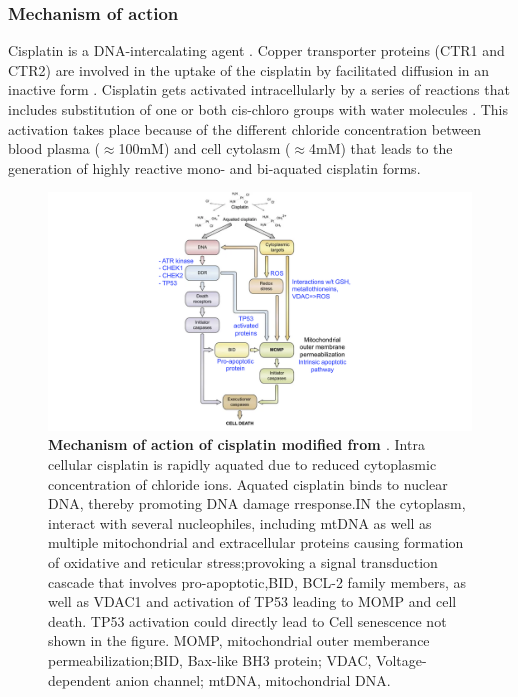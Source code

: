 \subsubsection{Mechanism of action}
Cisplatin is a DNA-intercalating agent \cite{dasari2014cisplatin, kartalou2001mechanisms}. Copper transporter proteins (CTR1 and CTR2) are involved in the uptake of the cisplatin by facilitated diffusion in an inactive form \cite{arnesano2018platinum,ishida2002uptake}. Cisplatin gets activated intracellularly by a series of reactions that includes substitution of one or both cis-chloro groups with water molecules \cite{el1999reactions}. This activation takes place because of the different chloride concentration between blood plasma ($\approx${100mM}) and cell cytolasm ($\approx${4mM}) that leads to the generation of highly reactive mono- and bi-aquated cisplatin forms.


\begin{figure}
\centering
\includegraphics[width=\textwidth]{Figures/chap1/CisplatinMA.png}
	\caption[Mechanism of action of cisplatin]
	{\small
	    \textbf{Mechanism of action of cisplatin modified from \cite{galluzzi2012molecular}}.
	     Intra cellular cisplatin is rapidly aquated due to reduced cytoplasmic concentration of chloride ions. Aquated cisplatin binds to nuclear DNA, thereby promoting DNA damage rresponse.IN the cytoplasm, interact with several nucleophiles, including mtDNA as well as multiple mitochondrial and extracellular proteins causing formation of oxidative and reticular stress;provoking a signal transduction cascade that involves pro-apoptotic,BID, BCL-2 family members, as well as VDAC1 and activation of TP53 leading to MOMP and cell death.
	    TP53 activation could directly lead to Cell senescence not shown in the figure. MOMP, mitochondrial outer memberance permeabilization;BID, Bax-like BH3 protein; VDAC, Voltage-dependent anion channel; mtDNA, mitochondrial DNA.
	}
	\label{fig:CisplatinMA}
\end{figure}

